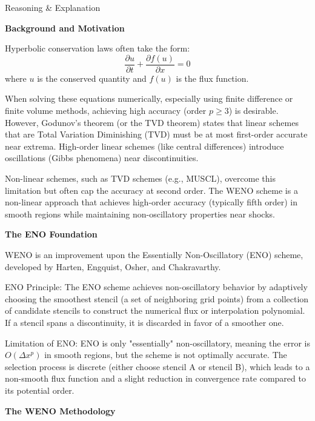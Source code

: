\documentclass[10pt,a4paper]{article}
\begin{document}
\begin{description}

\item Reasoning \& Explanation

\begin{description}

\item  \textbf{Background and Motivation}

Hyperbolic conservation laws often take the form:
$$\frac{\partial u}{\partial t} + \frac{\partial f(u)}{\partial x} = 0$$
where $u$ is the conserved quantity and $f(u)$ is the flux function.

When solving these equations numerically, especially using finite difference or finite volume methods, achieving high accuracy (order $p \ge 3$) is desirable. However, Godunov's theorem (or the TVD theorem) states that linear schemes that are Total Variation Diminishing (TVD) must be at most first-order accurate near extrema. High-order linear schemes (like central differences) introduce oscillations (Gibbs phenomena) near discontinuities.

Non-linear schemes, such as TVD schemes (e.g., MUSCL), overcome this limitation but often cap the accuracy at second order. The WENO scheme is a non-linear approach that achieves high-order accuracy (typically fifth order) in smooth regions while maintaining non-oscillatory properties near shocks.

\item \textbf{The ENO Foundation}

WENO is an improvement upon the Essentially Non-Oscillatory (ENO) scheme, developed by Harten, Engquist, Osher, and Chakravarthy.

ENO Principle: The ENO scheme achieves non-oscillatory behavior by adaptively choosing the smoothest stencil (a set of neighboring grid points) from a collection of candidate stencils to construct the numerical flux or interpolation polynomial. If a stencil spans a discontinuity, it is discarded in favor of a smoother one.\cite{}

Limitation of ENO: ENO is only "essentially" non-oscillatory, meaning the error is $O(\Delta x^p)$ in smooth regions, but the scheme is not optimally accurate. The selection process is discrete (either choose stencil A or stencil B), which leads to a non-smooth flux function and a slight reduction in convergence rate compared to its potential order.

\item \textbf{The WENO Methodology}


\end{description}
\end{description}
\end{document}
